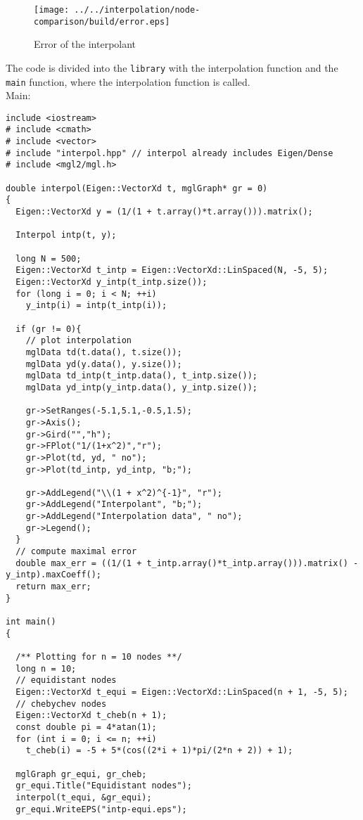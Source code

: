 \documentclass[a4paper]{article}
\begin{document}
\begin{figure}[h]
  \centering
  \texttt{[image: ../../interpolation/node-comparison/build/error.eps]}
  \caption{Error of the interpolant}
\end{figure}

The code is divided into the \texttt{library} with the interpolation function and the \texttt{main} function, where the interpolation
function is called.\\
Main:
\begin{verbatim}
include <iostream>
# include <cmath>
# include <vector>
# include "interpol.hpp" // interpol already includes Eigen/Dense
# include <mgl2/mgl.h>

double interpol(Eigen::VectorXd t, mglGraph* gr = 0)
{
  Eigen::VectorXd y = (1/(1 + t.array()*t.array())).matrix();

  Interpol intp(t, y);

  long N = 500;
  Eigen::VectorXd t_intp = Eigen::VectorXd::LinSpaced(N, -5, 5);
  Eigen::VectorXd y_intp(t_intp.size());
  for (long i = 0; i < N; ++i)
    y_intp(i) = intp(t_intp(i));

  if (gr != 0){
    // plot interpolation
    mglData td(t.data(), t.size());
    mglData yd(y.data(), y.size());
    mglData td_intp(t_intp.data(), t_intp.size());
    mglData yd_intp(y_intp.data(), y_intp.size());

    gr->SetRanges(-5.1,5.1,-0.5,1.5);
    gr->Axis();
    gr->Gird("","h");
    gr->FPlot("1/(1+x^2)","r");
    gr->Plot(td, yd, " no");
    gr->Plot(td_intp, yd_intp, "b;");

    gr->AddLegend("\\(1 + x^2)^{-1}", "r");
    gr->AddLegend("Interpolant", "b;");
    gr->AddLegend("Interpolation data", " no");
    gr->Legend();
  }
  // compute maximal error
  double max_err = ((1/(1 + t_intp.array()*t_intp.array())).matrix() - y_intp).maxCoeff();
  return max_err;
}

int main()
{

  /** Plotting for n = 10 nodes **/
  long n = 10;
  // equidistant nodes
  Eigen::VectorXd t_equi = Eigen::VectorXd::LinSpaced(n + 1, -5, 5);
  // chebychev nodes
  Eigen::VectorXd t_cheb(n + 1);
  const double pi = 4*atan(1);
  for (int i = 0; i <= n; ++i)
    t_cheb(i) = -5 + 5*(cos((2*i + 1)*pi/(2*n + 2)) + 1);

  mglGraph gr_equi, gr_cheb;
  gr_equi.Title("Equidistant nodes");
  interpol(t_equi, &gr_equi);
  gr_equi.WriteEPS("intp-equi.eps");


\end{verbatim}
\end{document}
